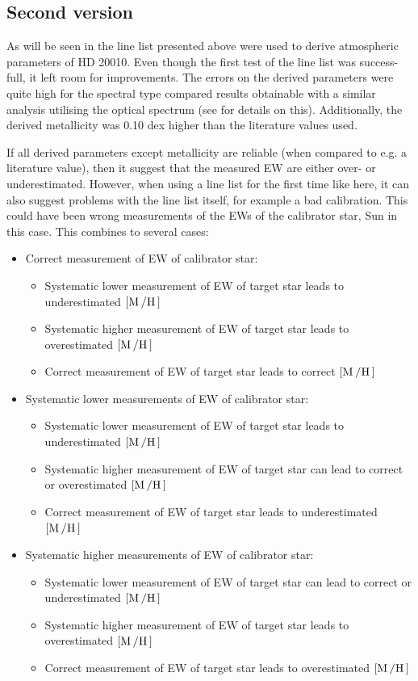 \subsection{Second version}

As will be seen in  the line list presented above were used to derive
atmospheric parameters of HD 20010. Even though the first test of the line list was success-full,
it left room for improvements. The errors on the derived parameters were quite high for the spectral
type compared results obtainable with a similar analysis utilising the optical spectrum (see
 for details on this).
Additionally, the derived metallicity was 0.10 dex higher than the literature values used.

If all derived parameters except metallicity are reliable (when compared to e.g. a literature
value), then it suggest that the measured EW are either over- or underestimated. However, when using
a line list for the first time like here, it can also suggest problems with the line list itself,
for example a bad calibration. This could have been wrong measurements of the EWs of the calibrator
star, Sun in this case. This combines to several cases:
\begin{itemize}
  \item Correct measurement of EW of calibrator star:
  \begin{itemize}
    \item Systematic lower measurement of EW of target star leads to underestimated $[\ion{M}/\ion{H}]$
    \item Systematic higher measurement of EW of target star leads to overestimated $[\ion{M}/\ion{H}]$
    \item Correct measurement of EW of target star leads to correct $[\ion{M}/\ion{H}]$
  \end{itemize}
  \item Systematic lower measurements of EW of calibrator star:
  \begin{itemize}
    \item Systematic lower measurement of EW of target star leads to underestimated $[\ion{M}/\ion{H}]$
    \item Systematic higher measurement of EW of target star can lead to correct or overestimated $[\ion{M}/\ion{H}]$
    \item Correct measurement of EW of target star leads to underestimated $[\ion{M}/\ion{H}]$
  \end{itemize}
  \item Systematic higher measurements of EW of calibrator star:
  \begin{itemize}
    \item Systematic lower measurement of EW of target star can lead to correct or underestimated $[\ion{M}/\ion{H}]$
    \item Systematic higher measurement of EW of target star leads to overestimated $[\ion{M}/\ion{H}]$
    \item Correct measurement of EW of target star leads to overestimated $[\ion{M}/\ion{H}]$
  \end{itemize}
\end{itemize}
